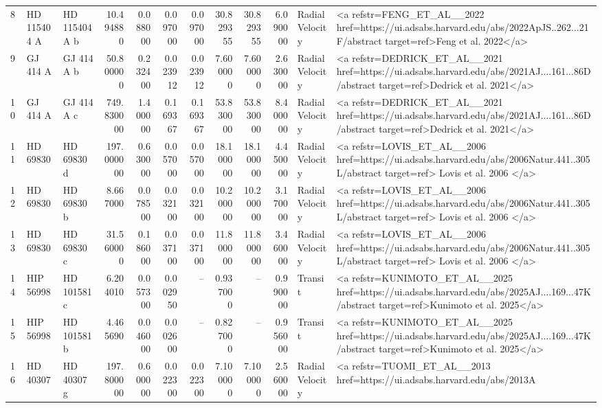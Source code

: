 \begin{tabular}{lllrrrrrrrll}
8 & HD 115404 A & HD 115404 A b & 10.494880 & 0.088000 & 0.097000 & 0.097000 & 30.829355 & 30.829355 & 6.090000 & Radial Velocity & <a refstr=FENG_ET_AL__2022 href=https://ui.adsabs.harvard.edu/abs/2022ApJS..262...21F/abstract target=ref>Feng et al. 2022</a> \\
9 & GJ 414 A & GJ 414 A b & 50.800000 & 0.232400 & 0.023912 & 0.023912 & 7.600000 & 7.600000 & 2.630000 & Radial Velocity & <a refstr=DEDRICK_ET_AL__2021 href=https://ui.adsabs.harvard.edu/abs/2021AJ....161...86D/abstract target=ref>Dedrick et al. 2021</a> \\
10 & GJ 414 A & GJ 414 A c & 749.830000 & 1.400000 & 0.169367 & 0.169367 & 53.830000 & 53.830000 & 8.400000 & Radial Velocity & <a refstr=DEDRICK_ET_AL__2021 href=https://ui.adsabs.harvard.edu/abs/2021AJ....161...86D/abstract target=ref>Dedrick et al. 2021</a> \\
11 & HD 69830 & HD 69830 d & 197.000000 & 0.630000 & 0.057000 & 0.057000 & 18.100000 & 18.100000 & 4.450000 & Radial Velocity & <a refstr=LOVIS_ET_AL__2006 href=https://ui.adsabs.harvard.edu/abs/2006Natur.441..305L/abstract target=ref> Lovis et al. 2006 </a> \\
12 & HD 69830 & HD 69830 b & 8.667000 & 0.078500 & 0.032100 & 0.032100 & 10.200000 & 10.200000 & 3.170000 & Radial Velocity & <a refstr=LOVIS_ET_AL__2006 href=https://ui.adsabs.harvard.edu/abs/2006Natur.441..305L/abstract target=ref> Lovis et al. 2006 </a> \\
13 & HD 69830 & HD 69830 c & 31.560000 & 0.186000 & 0.037100 & 0.037100 & 11.800000 & 11.800000 & 3.460000 & Radial Velocity & <a refstr=LOVIS_ET_AL__2006 href=https://ui.adsabs.harvard.edu/abs/2006Natur.441..305L/abstract target=ref> Lovis et al. 2006 </a> \\
14 & HIP 56998 & HD 101581 c & 6.204010 & 0.057300 & 0.002950 & -- & 0.937000 & -- & 0.990000 & Transit & <a refstr=KUNIMOTO_ET_AL__2025 href=https://ui.adsabs.harvard.edu/abs/2025AJ....169...47K/abstract target=ref>Kunimoto et al. 2025</a> \\
15 & HIP 56998 & HD 101581 b & 4.465690 & 0.046000 & 0.002600 & -- & 0.827000 & -- & 0.956000 & Transit & <a refstr=KUNIMOTO_ET_AL__2025 href=https://ui.adsabs.harvard.edu/abs/2025AJ....169...47K/abstract target=ref>Kunimoto et al. 2025</a> \\
16 & HD 40307 & HD 40307 g & 197.800000 & 0.600000 & 0.022300 & 0.022300 & 7.100000 & 7.100000 & 2.560000 & Radial Velocity & <a refstr=TUOMI_ET_AL__2013 href=https://ui.adsabs.harvard.edu/abs/2013A%

\end{tabular}
